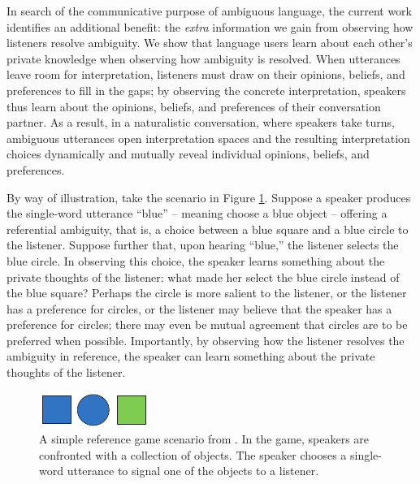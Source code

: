 \documentclass[10pt,a4paper]{article}
\begin{document}
In search of the communicative purpose of ambiguous language, the current work identifies an additional benefit: the \emph{extra} information we gain from observing how listeners resolve ambiguity.
We show that language users learn about each other's private knowledge when observing how ambiguity is resolved. 
When utterances leave room for interpretation, listeners must draw on their opinions, beliefs, and preferences to fill in the gaps;
by observing the concrete interpretation, speakers thus learn about the opinions, beliefs, and preferences of their conversation partner.
As a result, in a naturalistic conversation, where speakers take turns, ambiguous utterances open interpretation spaces and the resulting interpretation choices dynamically and mutually reveal individual opinions, beliefs, and preferences. 


By way of illustration, take the scenario in Figure \ref{FG-ref-game}.
Suppose a speaker produces the single-word utterance ``blue'' -- meaning choose a blue object -- offering a referential ambiguity, that is, a choice between a blue square and a blue circle to the listener. 
Suppose further that, upon hearing ``blue,'' the listener selects the blue circle.
In observing this choice, the speaker learns something about the private thoughts of the listener: what made her select the blue circle instead of the blue square? Perhaps the circle is more salient to the listener, or the listener has a preference for circles, or the listener may believe that the speaker has a preference for circles; there may even be mutual agreement that circles are to be preferred when possible. Importantly, by observing how the listener resolves the ambiguity in reference, the speaker can learn something about the private thoughts of the listener.


\begin{figure}
	\centering
	\includegraphics[width=.5\linewidth]{images/rsascene-eps-converted-to.pdf}
	\caption{A simple reference game scenario from \protect{}.
		In the game, speakers are confronted with a collection of objects. 
		The speaker chooses a single-word utterance to signal one of the objects to a listener.
		}
	\label{FG-ref-game}
\end{figure}
\end{document}
